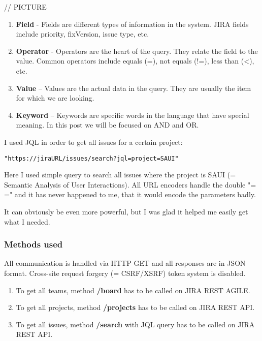 // PICTURE

\begin{enumerate}
	\item {\bf Field} - Fields are different types of information in the system. JIRA fields include priority, fixVersion, issue type, etc.
	\item {\bf Operator} - Operators are the heart of the query. They relate the field to the value. Common operators include equals (=), not equals (!=), less than (<), etc.
	\item {\bf Value} – Values are the actual data in the query. They are usually the item for which we are looking.
	\item {\bf Keyword} – Keywords are specific words in the language that have special meaning. In this post we will be focused on AND and OR.
\end{enumerate}

I used JQL in order to get all issues for a certain project:

\begin{lstlisting}
"https://jiraURL/issues/search?jql=project=SAUI"
\end{lstlisting}

Here I used simple query to search all issues where the project is SAUI (= Semantic Analysis of User Interactions). All URL encoders handle the double "= =" and it has never happened to me, that it would encode the parameters badly.

It can obviously be even more powerful, but I was glad it helped me easily get what I needed.

\subsubsection{Methods used}

All communication is handled via HTTP GET and all responses are in JSON format. Cross-site request forgery (= CSRF/XSRF) token system is disabled.

\begin{enumerate}
	\item To get all teams, method {\bf /board} has to be called on JIRA REST AGILE.
	\item To get all projects, method {\bf /projects} has to be called on JIRA REST API.
	\item To get all issues, method {\bf /search} with JQL query has to be called on JIRA REST API.
\end{enumerate}

